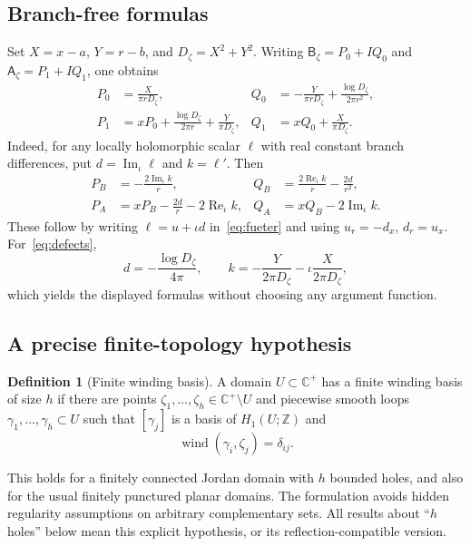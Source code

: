 \documentclass[11pt,a4paper]{article}
\numberwithin{equation}{section}
\theoremstyle{definition}
\newtheorem{definition}[theorem]{Definition}
\theoremstyle{remark}
\newcommand{\C}{\mathbb C}
\newcommand{\wind}{\operatorname{wind}}
\newcommand{\Rea}{\operatorname{Re}_{\iota}}
\newcommand{\Ima}{\operatorname{Im}_{\iota}}
\newcommand{\Adef}{\mathsf A}
\newcommand{\Bdef}{\mathsf B}
\begin{document}
\subsection{Branch-free formulas}
Set $X=x-a$, $Y=r-b$, and $D_\zeta=X^2+Y^2$. Writing
$\Bdef_\zeta=P_0+IQ_0$ and $\Adef_\zeta=P_1+IQ_1$, one obtains
\begin{align}
 P_0&=\frac{X}{\pi rD_\zeta},&
 Q_0&=-\frac{Y}{\pi rD_\zeta}+\frac{\log D_\zeta}{2\pi r^2},
 \label{eq:B-explicit}\\
 P_1&=xP_0+\frac{\log D_\zeta}{2\pi r}+\frac{Y}{\pi D_\zeta},&
 Q_1&=xQ_0+\frac{X}{\pi D_\zeta}.
 \label{eq:A-explicit}
\end{align}
Indeed, for any locally holomorphic scalar $\ell$ with real constant
branch differences, put $d=\Ima\ell$ and $k=\ell'$. Then
\begin{align}
 P_B&=-\frac{2\Ima k}{r},&
 Q_B&=\frac{2\Rea k}{r}-\frac{2d}{r^2},\label{eq:general-B}\\
 P_A&=xP_B-\frac{2d}{r}-2\Rea k,&
 Q_A&=xQ_B-2\Ima k.\label{eq:general-A}
\end{align}
These follow by writing $\ell=u+\iota d$ in~\eqref{eq:fueter} and
using $u_r=-d_x$, $d_r=u_x$. For~\eqref{eq:defects},
\[
 d=-\frac{\log D_\zeta}{4\pi},\qquad
 k=-\frac{Y}{2\pi D_\zeta}-\iota\frac{X}{2\pi D_\zeta},
\]
which yields the displayed formulas without choosing any argument function.

\subsection{A precise finite-topology hypothesis}
\begin{definition}[Finite winding basis]\label{def:winding}
A domain $U\subset\C^+$ has a finite winding basis of size $h$ if
there are points $\zeta_1,\ldots,\zeta_h\in\C^+\setminus U$ and
piecewise smooth loops $\gamma_1,\ldots,\gamma_h\subset U$ such that
$[\gamma_j]$ is a basis of $H_1(U;\mathbb Z)$ and
\[
 \wind(\gamma_i,\zeta_j)=\delta_{ij}.
\]
\end{definition}
This holds for a finitely connected Jordan domain with $h$ bounded
holes, and also for the usual finitely punctured planar domains.
The formulation avoids hidden regularity assumptions on arbitrary
complementary sets. All results about ``$h$ holes'' below mean this
explicit hypothesis, or its reflection-compatible version.
\end{document}
